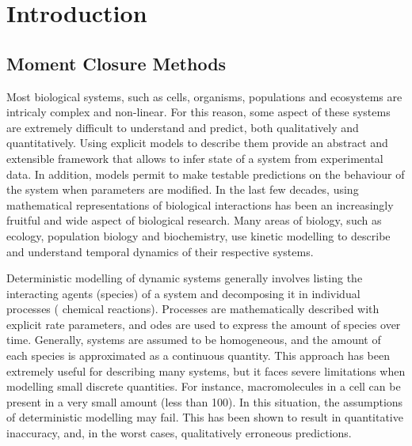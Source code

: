 \section{Introduction} \label{intro}
\subsection{Moment Closure Methods}

Most biological systems, such as cells, organisms, populations and ecosystems are intricaly complex and non-linear.
For this reason, some aspect of these systems are extremely difficult to understand and predict, both qualitatively and quantitatively\cite{klipp_systems_2013}.
Using explicit models to describe them provide an abstract and extensible framework that allows to infer state of a system from experimental data.
In addition, models permit to make testable predictions on the behaviour of the system when parameters are modified.
In the last few decades, using mathematical representations of biological interactions has been an increasingly fruitful and wide aspect of biological research.
Many areas of biology, such as ecology, population biology and biochemistry,
use kinetic modelling to describe and understand temporal dynamics of their respective systems.

Deterministic modelling of dynamic systems generally involves listing the interacting agents (species) of a system and decomposing
it in individual processes (\eg{} chemical reactions).
Processes are mathematically described with explicit rate parameters, and \glspl{ode} are used to express the amount of species over time.
Generally, systems are assumed to be homogeneous, and the amount of each species is approximated as a continuous quantity.
This approach has been extremely useful for describing many systems, but it faces severe limitations when modelling small discrete quantities.
For instance, macromolecules in a cell can be present in a very small amount (less than 100).
In this situation, the assumptions of deterministic modelling may fail.
This has been shown to result in quantitative inaccuracy, and, in the worst cases, qualitatively erroneous predictions.


